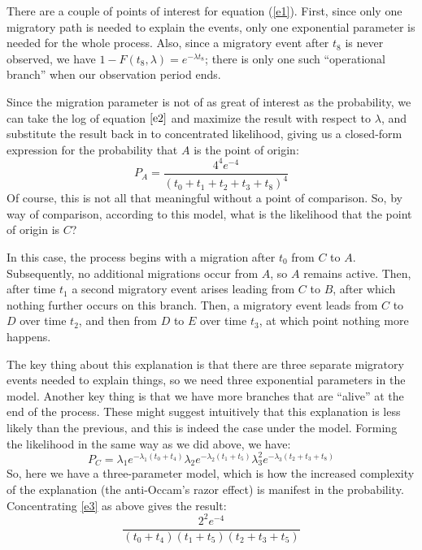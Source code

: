 \documentclass[11pt]{article}
\begin{document}
There are a couple of points of interest for equation (\ref{e1}). First, since only one migratory path is needed to explain the events, only one
exponential parameter is needed for the whole process. Also, since a migratory event after $t_8$ is never observed, we have $1-F(t_8,\lambda) = e^{-\lambda t_8}$; there is only one such ``operational branch'' when our observation period ends.

Since the migration parameter is not of as great of interest as the probability, we can take the log of equation $\ref{e2}$ and maximize the result with respect to $\lambda$, and substitute the result back in to concentrated likelihood, giving us a closed-form expression for the probability that $A$ is the point of origin:
\begin{equation} \label{e2}
P_A = \frac{4^4e^{-4}}{(t_0+t_1+t_2+t_3+t_8)^4}
\end{equation}
Of course, this is not all that meaningful without a point of comparison. So, by way of comparison, according to this model, what is the likelihood that the point of origin is $C$?

In this case, the process begins with a migration after $t_0$ from $C$ to $A$. Subsequently, no additional migrations occur from $A$, so $A$ remains active. Then, after time $t_1$ a second migratory event arises leading from $C$ to $B$, after which nothing further occurs on this branch. Then, a migratory event leads from $C$ to $D$ over time $t_2$, and then from $D$ to $E$ over time $t_3$, at which point nothing more happens.

The key thing about this explanation is that there are three separate migratory events needed to explain things, so we need three exponential parameters in the model. Another key thing is that we have more branches that are ``alive'' at the end of the process. These might suggest intuitively that this explanation is less likely than the previous, and this is indeed the case under the model. Forming the likelihood in the
same way as we did above, we have:
\begin{equation} \label{e3}
P_C = \lambda_1e^{-\lambda_1(t_0+t_4)} \lambda_2 e^{-\lambda_2 (t_1+t_5)}\lambda_3^2 e^{-\lambda_3 (t_2+t_3+t_8)}
\end{equation}
So, here we have a three-parameter model, which is how the increased complexity of the explanation (the anti-Occam's razor effect) is manifest in the probability. Concentrating \ref{e3} as above gives the result:
\begin{equation} \label{e4}
\frac{2^2e^{-4}}{(t_0+t_4)(t_1+t_5)(t_2+t_3+t_5)}
\end{equation}
\end{document}
